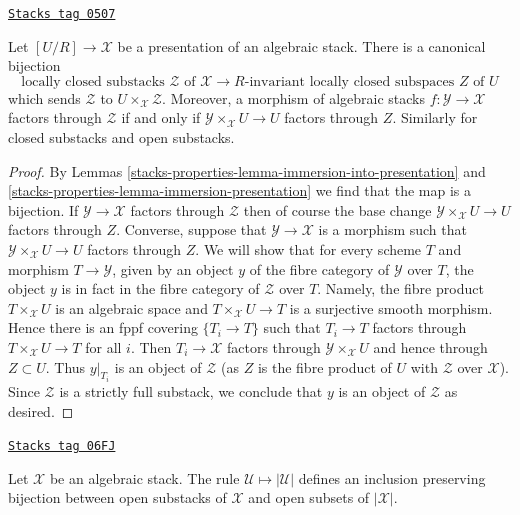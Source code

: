 \begin{lemma}
\label{stacks-properties-lemma-substacks-presentation}
\href{https://stacks.math.columbia.edu/tag/0507}{\texttt{Stacks tag 0507}}

Let $[U/R] \to \mathcal{X}$ be a presentation of an algebraic stack.
There is a canonical bijection
$$
\text{locally closed substacks }\mathcal{Z}\text{ of }\mathcal{X}
\longrightarrow
R\text{-invariant locally closed subspaces }Z\text{ of }U
$$
which sends $\mathcal{Z}$ to $U \times_\mathcal{X} \mathcal{Z}$.
Moreover, a morphism of algebraic stacks $f : \mathcal{Y} \to \mathcal{X}$
factors through $\mathcal{Z}$ if and only if
$\mathcal{Y} \times_\mathcal{X} U \to U$ factors through $Z$.
Similarly for closed substacks and open substacks.
\end{lemma}

\begin{proof}
By Lemmas \ref{stacks-properties-lemma-immersion-into-presentation} and
\ref{stacks-properties-lemma-immersion-presentation}
we find that the map is a bijection.
If $\mathcal{Y} \to \mathcal{X}$ factors through $\mathcal{Z}$
then of course the base change $\mathcal{Y} \times_\mathcal{X} U \to U$
factors through $Z$. Converse, suppose that $\mathcal{Y} \to \mathcal{X}$
is a morphism such that $\mathcal{Y} \times_\mathcal{X} U \to U$
factors through $Z$. We will show that for every scheme $T$ and
morphism $T \to \mathcal{Y}$,
given by an object $y$ of the fibre category of $\mathcal{Y}$ over $T$,
the object $y$ is in fact in the fibre category of $\mathcal{Z}$ over $T$.
Namely, the fibre product $T \times_\mathcal{X} U$ is an algebraic
space and $T \times_\mathcal{X} U \to T$ is a surjective smooth morphism.
Hence there is an fppf covering $\{T_i \to T\}$ such that
$T_i \to T$ factors through $T \times_\mathcal{X} U \to T$ for all $i$.
Then $T_i \to \mathcal{X}$ factors through $\mathcal{Y} \times_\mathcal{X} U$
and hence through $Z \subset U$. Thus $y|_{T_i}$ is an object of
$\mathcal{Z}$ (as $Z$ is the fibre product of $U$ with
$\mathcal{Z}$ over $\mathcal{X}$).
Since $\mathcal{Z}$ is a strictly full substack, we conclude
that $y$ is an object of $\mathcal{Z}$ as desired.
\end{proof}

\begin{lemma}
\label{stacks-properties-lemma-open-substacks}
\href{https://stacks.math.columbia.edu/tag/06FJ}{\texttt{Stacks tag 06FJ}}

Let $\mathcal{X}$ be an algebraic stack. The rule
$\mathcal{U} \mapsto |\mathcal{U}|$ defines an inclusion preserving
bijection between open substacks of $\mathcal{X}$ and open subsets
of $|\mathcal{X}|$.
\end{lemma}

